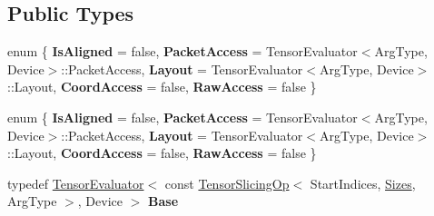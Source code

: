 \subsection*{Public Types}
\begin{DoxyCompactItemize}
\item 
\mbox{\label{struct_eigen_1_1_tensor_evaluator_3_01_tensor_slicing_op_3_01_start_indices_00_01_sizes_00_01_arg_type_01_4_00_01_device_01_4_a0b0baf714c2fc11ef810669c9e767a8d}} 
enum \{ \newline
{\bfseries Is\+Aligned} = false, 
{\bfseries Packet\+Access} = Tensor\+Evaluator$<$Arg\+Type, Device$>$\+:\+:Packet\+Access, 
{\bfseries Layout} = Tensor\+Evaluator$<$Arg\+Type, Device$>$\+:\+:Layout, 
{\bfseries Coord\+Access} = false, 
\newline
{\bfseries Raw\+Access} = false
 \}
\item 
\mbox{\label{struct_eigen_1_1_tensor_evaluator_3_01_tensor_slicing_op_3_01_start_indices_00_01_sizes_00_01_arg_type_01_4_00_01_device_01_4_aa5311a274e7def937240ed273b7660c7}} 
enum \{ \newline
{\bfseries Is\+Aligned} = false, 
{\bfseries Packet\+Access} = Tensor\+Evaluator$<$Arg\+Type, Device$>$\+:\+:Packet\+Access, 
{\bfseries Layout} = Tensor\+Evaluator$<$Arg\+Type, Device$>$\+:\+:Layout, 
{\bfseries Coord\+Access} = false, 
\newline
{\bfseries Raw\+Access} = false
 \}
\item 
\mbox{\label{struct_eigen_1_1_tensor_evaluator_3_01_tensor_slicing_op_3_01_start_indices_00_01_sizes_00_01_arg_type_01_4_00_01_device_01_4_a816a057cef67333cec2f493ef046468c}} 
typedef \hyperlink{struct_eigen_1_1_tensor_evaluator}{Tensor\+Evaluator}$<$ const \hyperlink{class_eigen_1_1_tensor_slicing_op}{Tensor\+Slicing\+Op}$<$ Start\+Indices, \hyperlink{struct_eigen_1_1_sizes}{Sizes}, Arg\+Type $>$, Device $>$ {\bfseries Base}
\item 
\mbox{\label{struct_eigen_1_1_tensor_evaluator_3_01_tensor_slicing_op_3_01_start_indices_00_01_sizes_00_01_arg_type_01_4_00_01_device_01_4_a7f99a4a4c16892efb93654631a35d4f6}} 

\end{DoxyCompactItemize}
